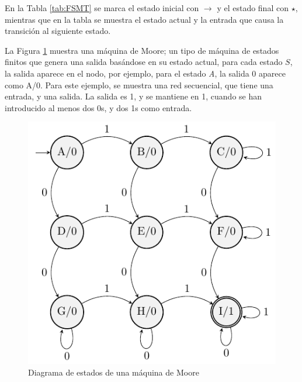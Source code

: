 \documentclass[journal,trans]{IEEEtran}
\begin{document}
	En la Tabla \ref{tab:FSMT} se marca el estado inicial con $\to$ y el estado final con $\star$, mientras que en la tabla se muestra el estado actual y la entrada que causa la transición al siguiente estado.
	
	\vspace{4mm}
	
	La Figura \ref{figmachineMoore} muestra una máquina de Moore; un tipo de máquina de estados finitos que genera una salida basándose en su estado actual, para cada estado $S$, la salida aparece en el nodo, por ejemplo, para el estado \emph{A}, la salida 0 aparece como A/0. Para este ejemplo, se muestra una red secuencial, que tiene una entrada, y una salida. La salida es 1, y se mantiene en 1, cuando se han introducido al menos dos 0s, y dos 1s como entrada.
	
	\begin{figure}[h]
		\centering
		\includegraphics{./imagenes/machineMoore.pdf}
		\caption{Diagrama de estados de una máquina de Moore}
		\label{figmachineMoore}
	\end{figure}
	
\end{document}
